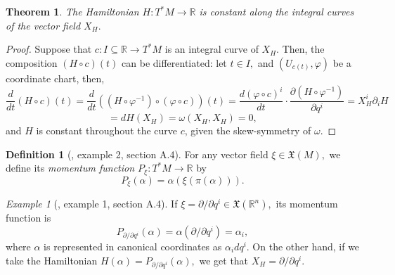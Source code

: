 \documentclass[12pt, letterpaper, reqno]{amsart}
\theoremstyle{definition}
\newtheorem{df}{Definition}
\theoremstyle{plain}
\newtheorem{thm}{Theorem}
\theoremstyle{remark}
\newtheorem{ex}{Example}
\begin{document}
\begin{thm}\label{thm:constantCurves}
The Hamiltonian $ H: T^*M \rightarrow \mathbb{R} $ is constant along the integral curves of the vector field $ X_H. $ 	
\end{thm}

\begin{proof}
	Suppose that $ c:I\subseteq \mathbb{R} \rightarrow T^*M $ is an integral curve of $ X_H. $ Then, the composition $ (H\circ c) (t) $ can be differentiated: let $ t\in I, $ and $ (U_{c(t)}, \varphi) $ be a coordinate chart, then, 
	$$ \frac{d}{dt} (H\circ c)(t) = \frac{d}{dt} \left( \left( H\circ \varphi^{-1} \right)\circ \left( \varphi\circ c \right) \right)(t) = \frac{d(\varphi\circ c)^i}{dt}\cdot \frac{\partial (H\circ \varphi^{-1})}{\partial q^i}= X_H^i \partial_i H $$ $$= dH(X_H)=\omega(X_H, X_H)=0,$$    
	and $ H $ is constant throughout the curve $ c $, given the skew-symmetry of $ \omega $. 
\end{proof}

\begin{df}[\cite{montgomery2002tour}, example 2, section A.4]
	For any vector field $ \xi\in \mathfrak{X}(M), $ we define its \textit{ momentum function $ P_\xi:T^*M \rightarrow \mathbb{R} $} by
	$$ P_\xi(\alpha)= \alpha(\xi(\pi(\alpha))). $$ 
\end{df}

\begin{ex}[\cite{montgomery2002tour}, example 1, section A.4]
	If $ \xi=\partial/\partial q^i\in \mathfrak{X}( \mathbb{R}^n), $ its momentum function is
	$$ P_{\partial/\partial q^i}(\alpha)=\alpha(\partial/\partial q^i) = \alpha_i, $$ 
	where $ \alpha$ is represented in canonical coordinates as $ \alpha_i dq^i $. On the other hand, if we take the Hamiltonian $ H(\alpha)=P_{\partial/\partial q^i}(\alpha), $ we get that $ X_H=\partial /\partial q^i. $ 
\end{ex}
\end{document}
